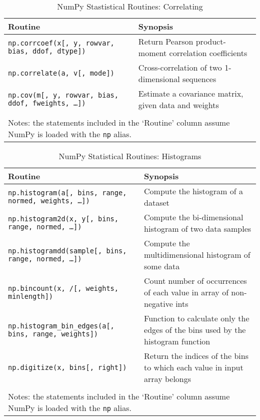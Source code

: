 \documentclass[a4paper,11pt]{book}
\numberwithin{figure}{chapter}
\numberwithin{table}{chapter}
\begin{document}
\begin{sidewaystable}[!htbp]
	\centering
	\caption{NumPy Stastistical Routines: Correlating}
	\label{tab:correlating}
	\begin{tabular}{ll}
		\toprule \toprule
			Routine & Synopsis \\
			\midrule
                        \texttt{np.corrcoef(x[, y, rowvar, bias, ddof, dtype])}&
                        Return Pearson product-moment correlation coefficients\\
                        \texttt{np.correlate(a, v[, mode])}&
                        Cross-correlation of two 1-dimensional sequences\\
                        \texttt{np.cov(m[, y, rowvar, bias, ddof, fweights, \ldots])}&
                        Estimate a covariance matrix, given data and weights\\
                        \bottomrule \\[-1.8ex]
	        \multicolumn{2}{l}{Notes: the statements included in the `Routine' column assume NumPy is loaded with the \texttt{np} alias.} \\
	\end{tabular}
\end{sidewaystable}

\begin{sidewaystable}[!htbp]
	\centering
	\caption{NumPy Statistical Routines: Histograms}
	\label{tab:histograms}
	\begin{tabular}{ll}
		\toprule \toprule
			Routine & Synopsis \\
			\midrule
                        \texttt{np.histogram(a[, bins, range, normed, weights, \ldots])}&
                        Compute the histogram of a dataset\\
                        \texttt{np.histogram2d(x, y[, bins, range, normed, \ldots])}&
                        Compute the bi-dimensional histogram of two data samples\\
                        \texttt{np.histogramdd(sample[, bins, range, normed, \ldots])}&
                        Compute the multidimensional histogram of some data\\
                        \texttt{np.bincount(x, /[, weights, minlength])}&
                        Count number of occurrences of each value in array of non-negative ints\\
                        \texttt{np.histogram\_bin\_edges(a[, bins, range, weights])}&
                        Function to calculate only the edges of the bins used by the histogram function\\
                        \texttt{np.digitize(x, bins[, right])}&
                        Return the indices of the bins to which each value in input array belongs\\
	     	\bottomrule \\[-1.8ex]
	        \multicolumn{2}{l}{Notes: the statements included in the `Routine' column assume NumPy is loaded with the \texttt{np} alias.} \\
	\end{tabular}
\end{sidewaystable}
\end{document}
